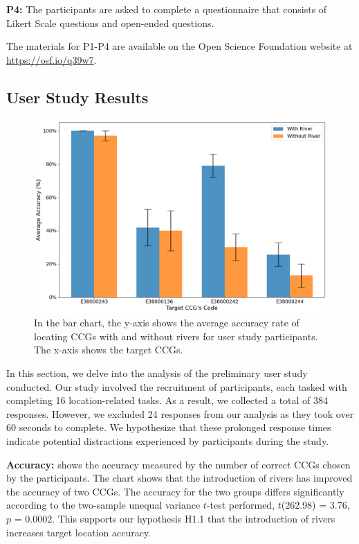 \documentclass[Afour,sagev,times]{sagej}
\newcommand{\bobgraph}[1]{\noindent\textbf{#1}}
\begin{document}
\textbf{P4:} The participants are asked to complete a questionnaire that consists of Likert Scale questions and open-ended questions.

The materials for P1-P4 are available on the Open Science Foundation website at \url{https://osf.io/q39w7}.

\subsection{User Study Results}
\label{subsec:{User Study Results}}

{
\begin{figure}[b!]
    \centering
    \includegraphics[width=\columnwidth,keepaspectratio]{accuracy.png}
    \caption{In the bar chart, the y-axis shows the average accuracy rate of locating CCGs with and without rivers for user study participants. The x-axis shows the target CCGs.}
    \label{fig:task-acc}
\end{figure}
}


In this section, we delve into the analysis of the preliminary user study conducted. Our study involved the recruitment of \pCount participants, each tasked with completing 16 location-related tasks. As a result, we collected a total of 384 responses. However, we excluded 24 responses from our analysis as they took over 60 seconds to complete. We hypothesize that these prolonged response times indicate potential distractions experienced by participants during the study.

\bobgraph{Accuracy:}  shows the accuracy measured by the number of correct CCGs chosen by the participants. The chart shows that the introduction of rivers has improved the accuracy of two CCGs. The accuracy for the two groups differs significantly according to the two-sample unequal variance $t$-test performed, $t$(262.98) = 3.76, $p$ = 0.0002. This supports our hypothesis H1.1 that the introduction of rivers increases target location accuracy.
\end{document}
